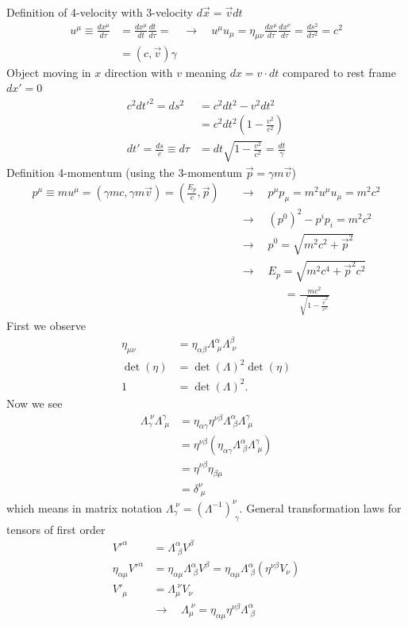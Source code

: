 \documentclass[10pt,a4paper]{book}
\theoremstyle{definition}
\begin{document}
Definition of 4-velocity with 3-velocity $d\vec{x} = \vec{v} dt$
\begin{align}
    u^\mu\equiv\frac{dx^\mu}{d\tau}&=\frac{dx^\mu}{dt}\frac{dt}{d\tau}=\quad\rightarrow\quad u^\mu u_\mu=\eta_{\mu\nu}\frac{dx^\mu}{d\tau} \frac{dx^\nu}{d\tau}=\frac{ds^2}{d\tau^2}=c^2\\
    &=(c,\vec{v})\gamma
\end{align}
Object moving in $x$ direction with $v$ meaning $dx=v\cdot dt$ compared to
rest frame $dx'=0$
\begin{align}
    c^2dt'^2=ds^2 &= c^2dt^2- v^2 dt^2\\
    &=c^2dt^2\left(1-\frac{v^2}{c^2}\right)\\
    dt'=\frac{ds}{c}\equiv d\tau&=dt\sqrt{1-\frac{v^2}{c^2}}=\frac{dt}{\gamma}
\end{align}
Definition 4-momentum (using the 3-momentum $\vec{p}=\gamma m\vec{v}$)
\begin{align}
    p^\mu \equiv mu^\mu=(\gamma mc,\gamma m\vec{v})=\left(\frac{E_p}{c},\vec{p}\right)\quad&\rightarrow\quad p^\mu p _\mu=m^2u^\mu u_\mu=m^2c^2\\
    &\rightarrow\quad (p^0)^2-p^ip_i=m^2c^2\\
    &\rightarrow\quad p^0=\sqrt{m^2c^2+\vec{p}^2}\\
    &\rightarrow\quad E_p=\sqrt{m^2c^4+\vec{p}^2c^2}\\
    &\qquad\qquad=\frac{mc^2}{\sqrt{1-\frac{\vec{v}^2}{c^2}}}
\end{align}
First we observe
\begin{align}
    \eta_{\mu\nu} &= \eta_{\alpha\beta}\Lambda^\alpha_{\;\mu} \Lambda^\beta_{\;\nu}\\
    \det(\eta)&=\det(\Lambda)^2\det(\eta)\\
    1&=\det(\Lambda)^2.
\end{align}
Now we see
\begin{align}
    \Lambda_\gamma^{\;\nu}\Lambda^\gamma_{\;\mu}&=\eta_{\alpha\gamma}\eta^{\nu\beta}\Lambda^\alpha_{\;\beta} \Lambda^\gamma_{\;\mu}\\
    &=\eta^{\nu\beta}(\eta_{\alpha\gamma}\Lambda^\alpha_{\;\beta} \Lambda^\gamma_{\;\mu})\\
    &=\eta^{\nu\beta}\eta_{\beta\mu}\\
    &=\delta^\nu_{\;\mu}
\end{align}
which means in matrix notation $\Lambda_\gamma^{\;\nu}=(\Lambda^{-1})^\nu_{\;\gamma}$.
General transformation laws for tensors of first order
\begin{align}
    V'^\alpha&=\Lambda^\alpha_{\;\beta}V^\beta\\
    \eta_{\alpha\mu}V'^\alpha&=\eta_{\alpha\mu}\Lambda^\alpha_{\;\beta}V^\beta=\eta_{\alpha\mu}\Lambda^\alpha_{\;\beta}(\eta^{\nu\beta}V_\nu)\\
    V'_\mu&=\Lambda_\mu^{\;\nu}V_\nu\\
    &\rightarrow\quad \Lambda_\mu^{\;\nu} = \eta_{\alpha\mu}\eta^{\nu\beta}\Lambda^\alpha_{\;\beta}
\end{align}
\end{document}
